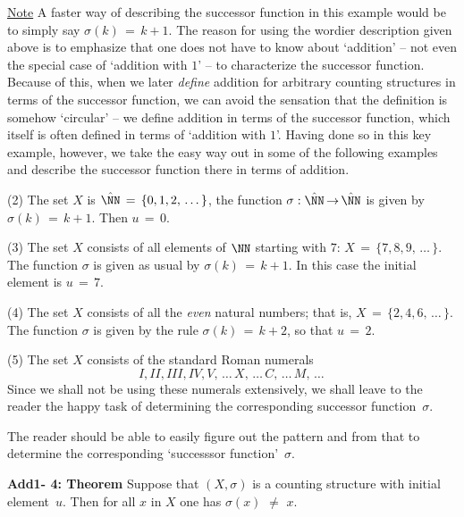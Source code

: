 {        \underline{Note} A faster way of describing the successor function in this example would be to simply say ${\sigma}(k) \,=\, k+1$.
    The reason for using the wordier description given above is to emphasize that one does not have to know about `addition' --
    not even the special case of `addition with $1$' -- to characterize the successor function.
    Because of this, when we later {\em define} addition for arbitrary counting structures in terms of the successor function,
    we can avoid the sensation that the definition is somehow `circular' -- we define addition in terms of the successor function,
        which itself is often defined in terms of `addition with $1$'.
    Having done so in this key example, however, we take the easy way out in some of the following examples
    and describe the successor function there in terms of addition.

\V

        (2) The set $X$ is $\hat{{\NN}} \,=\, \{0,1,2,\,{\ldots}\,\}$, the function ${\sigma}:\hat{{\NN}} \,{\rightarrow}\, \hat{{\NN}}$ is given by ${\sigma}(k) \,=\, k+1$.
    Then $u \,=\, 0$.

\V

        (3) The set $X$ consists of all elements of ${\NN}$ starting with $7$:
    $X \,=\, \{7, 8, 9, \,{\ldots}\,\}$.
    The function ${\sigma}$ is given as usual by ${\sigma}(k) \,=\, k+1$.
    In this case the initial element is $u \,=\, 7$.

\V

        (4) The set $X$ consists of all the {\em even} natural numbers; that is, $X \,=\, \{2,4,6,\,{\ldots}\,\}$.
    The function ${\sigma}$ is given by the rule ${\sigma}(k) \,=\, k+2$, so that $u \,=\, 2$.

\V

        (5) The set $X$ consists of the standard Roman numerals
        \begin{displaymath}
        I, II, III, IV, V,\,{\ldots}\,X,\,{\ldots}\,C,\,{\ldots}\,M,\,{\ldots}\,
        \end{displaymath}
    Since we shall not be using these numerals extensively, we shall leave to the reader the happy task of determining the corresponding successor function~${\sigma}$.

    The reader should be able to easily figure out the pattern and from that to determine the corresponding `successsor function'~${\sigma}$.

\V
\V

        {\bf Add1- 4: Theorem} Suppose that $(X,{\sigma})$ is a counting structure with initial element~$u$.
    Then for all $x$ in $X$ one has ${\sigma}(x) \,\,{\neq}\,\, x$.

}
